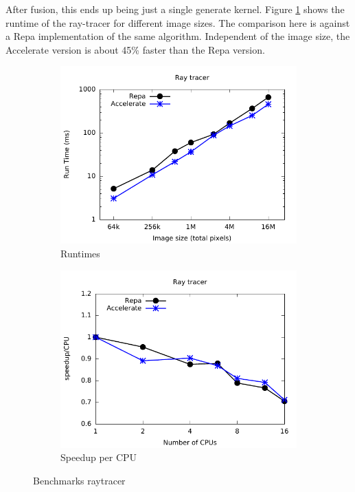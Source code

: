 \documentclass[a4paper,bibliography=totocnumbered,parskip,headsepline]{scrbook}
\begin{document}
After fusion, this ends up being just a single generate kernel.
Figure \ref{fig:ray_bench} shows the runtime of the ray-tracer for different image sizes.
The comparison here is against a Repa implementation of the same algorithm.
Independent of the image size, the Accelerate version is about 45\% faster than the Repa version.

\begin{figure}
\centering
\begin{subfigure}[t]{0.8\linewidth}
    \centering
    \includegraphics[width=\textwidth]{images/benchmarks/ray/ray}
    \caption{Runtimes}
    \label{fig:ray_bench}
\end{subfigure}
\begin{subfigure}[t]{0.8\linewidth}
    \centering
    \includegraphics[width=\textwidth]{images/benchmarks/ray/ray-scale}
    \caption{Speedup per CPU}
    \label{fig:ray_scale}
\end{subfigure}
\caption{Benchmarks raytracer}
\end{figure}
\end{document}
